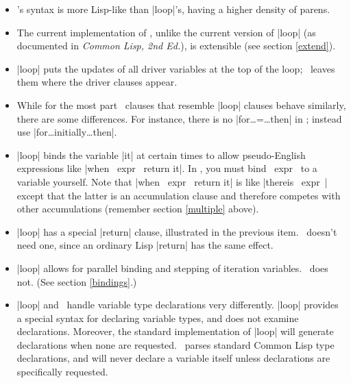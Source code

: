 \begin{itemize}

\item \iter's syntax is more Lisp-like than |loop|'s, having a higher
density of parens.

\item The current implementation of \iter, unlike the current version
of  |loop| (as documented in {\em Common Lisp, 2nd Ed.\/}), is
extensible (see section \ref{extend}).

\item |loop| puts the updates of all driver variables at the top of
the loop; \iter\ leaves them where the driver clauses appear.

\item While for the most part \iter\ clauses that resemble |loop| clauses
behave similarly, there are some differences.  For instance, there is
no |for\dots =\dots then| in \iter; instead use
|for\dots initially\dots then|.

\item |loop| binds the variable |it| at certain times
to allow pseudo-English expressions like |when ~expr~ return it|.
In \iter, you must bind ~expr~ to a variable yourself.  Note that
|when ~expr~ return it| is like |thereis ~expr~| except that the latter is an
accumulation clause and therefore competes with other accumulations
(remember section \ref{multiple} above).


\item |loop| has a special |return| clause, illustrated in the
previous item.  \iter\ doesn't need one,  since an ordinary Lisp
|return| has the same effect.

\item |loop| allows for parallel binding and stepping of iteration
variables.  \iter\ does not.  (See section \ref{bindings}.)

\item |loop| and \iter\ handle variable type declarations very
differently.  |loop| provides a special syntax for declaring variable
types, and does not examine declarations.  Moreover, the standard
implementation of |loop| will
generate declarations when none are requested.
\iter\ parses standard Common Lisp type declarations, and will never
declare a variable itself unless declarations are
specifically requested.

\end{itemize}

